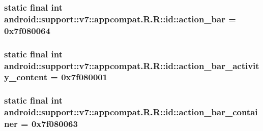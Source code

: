 \hypertarget{classandroid_1_1support_1_1v7_1_1appcompat_1_1_r_1_1id_6e7d41b9acb791a5a25da3c7334c7636}{
\subsubsection[{action\_\-bar}]{\setlength{\rightskip}{0pt plus 5cm}static final int android::support::v7::appcompat.R.R::id::action\_\-bar = 0x7f080064}}
\label{classandroid_1_1support_1_1v7_1_1appcompat_1_1_r_1_1id_6e7d41b9acb791a5a25da3c7334c7636}


\hypertarget{classandroid_1_1support_1_1v7_1_1appcompat_1_1_r_1_1id_40c1c27384cb668ad921c7a0ad79360f}{
\subsubsection[{action\_\-bar\_\-activity\_\-content}]{\setlength{\rightskip}{0pt plus 5cm}static final int android::support::v7::appcompat.R.R::id::action\_\-bar\_\-activity\_\-content = 0x7f080001}}
\label{classandroid_1_1support_1_1v7_1_1appcompat_1_1_r_1_1id_40c1c27384cb668ad921c7a0ad79360f}


\hypertarget{classandroid_1_1support_1_1v7_1_1appcompat_1_1_r_1_1id_9ed358a683b2b60cdf2ab8128cb5a514}{
\subsubsection[{action\_\-bar\_\-container}]{\setlength{\rightskip}{0pt plus 5cm}static final int android::support::v7::appcompat.R.R::id::action\_\-bar\_\-container = 0x7f080063}}
\label{classandroid_1_1support_1_1v7_1_1appcompat_1_1_r_1_1id_9ed358a683b2b60cdf2ab8128cb5a514}



